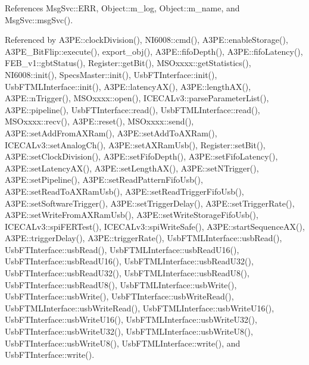 References Msg\+Svc\+::\+E\+RR, Object\+::m\+\_\+log, Object\+::m\+\_\+name, and Msg\+Svc\+::msg\+Svc().



Referenced by A3\+P\+E\+::clock\+Division(), N\+I6008\+::cmd(), A3\+P\+E\+::enable\+Storage(), A3\+P\+E\+\_\+\+Bit\+Flip\+::execute(), export\+\_\+obj(), A3\+P\+E\+::fifo\+Depth(), A3\+P\+E\+::fifo\+Latency(), F\+E\+B\+\_\+v1\+::gbt\+Status(), Register\+::get\+Bit(), M\+S\+Oxxxx\+::get\+Statistics(), N\+I6008\+::init(), Specs\+Master\+::init(), Usb\+F\+T\+Interface\+::init(), Usb\+F\+T\+M\+L\+Interface\+::init(), A3\+P\+E\+::latency\+A\+X(), A3\+P\+E\+::length\+A\+X(), A3\+P\+E\+::n\+Trigger(), M\+S\+Oxxxx\+::open(), I\+C\+E\+C\+A\+Lv3\+::parse\+Parameter\+List(), A3\+P\+E\+::pipeline(), Usb\+F\+T\+Interface\+::read(), Usb\+F\+T\+M\+L\+Interface\+::read(), M\+S\+Oxxxx\+::recv(), A3\+P\+E\+::reset(), M\+S\+Oxxxx\+::send(), A3\+P\+E\+::set\+Add\+From\+A\+X\+Ram(), A3\+P\+E\+::set\+Add\+To\+A\+X\+Ram(), I\+C\+E\+C\+A\+Lv3\+::set\+Analog\+Ch(), A3\+P\+E\+::set\+A\+X\+Ram\+Usb(), Register\+::set\+Bit(), A3\+P\+E\+::set\+Clock\+Division(), A3\+P\+E\+::set\+Fifo\+Depth(), A3\+P\+E\+::set\+Fifo\+Latency(), A3\+P\+E\+::set\+Latency\+A\+X(), A3\+P\+E\+::set\+Length\+A\+X(), A3\+P\+E\+::set\+N\+Trigger(), A3\+P\+E\+::set\+Pipeline(), A3\+P\+E\+::set\+Read\+Pattern\+Fifo\+Usb(), A3\+P\+E\+::set\+Read\+To\+A\+X\+Ram\+Usb(), A3\+P\+E\+::set\+Read\+Trigger\+Fifo\+Usb(), A3\+P\+E\+::set\+Software\+Trigger(), A3\+P\+E\+::set\+Trigger\+Delay(), A3\+P\+E\+::set\+Trigger\+Rate(), A3\+P\+E\+::set\+Write\+From\+A\+X\+Ram\+Usb(), A3\+P\+E\+::set\+Write\+Storage\+Fifo\+Usb(), I\+C\+E\+C\+A\+Lv3\+::spi\+F\+E\+R\+Test(), I\+C\+E\+C\+A\+Lv3\+::spi\+Write\+Safe(), A3\+P\+E\+::start\+Sequence\+A\+X(), A3\+P\+E\+::trigger\+Delay(), A3\+P\+E\+::trigger\+Rate(), Usb\+F\+T\+M\+L\+Interface\+::usb\+Read(), Usb\+F\+T\+Interface\+::usb\+Read(), Usb\+F\+T\+M\+L\+Interface\+::usb\+Read\+U16(), Usb\+F\+T\+Interface\+::usb\+Read\+U16(), Usb\+F\+T\+M\+L\+Interface\+::usb\+Read\+U32(), Usb\+F\+T\+Interface\+::usb\+Read\+U32(), Usb\+F\+T\+M\+L\+Interface\+::usb\+Read\+U8(), Usb\+F\+T\+Interface\+::usb\+Read\+U8(), Usb\+F\+T\+M\+L\+Interface\+::usb\+Write(), Usb\+F\+T\+Interface\+::usb\+Write(), Usb\+F\+T\+Interface\+::usb\+Write\+Read(), Usb\+F\+T\+M\+L\+Interface\+::usb\+Write\+Read(), Usb\+F\+T\+M\+L\+Interface\+::usb\+Write\+U16(), Usb\+F\+T\+Interface\+::usb\+Write\+U16(), Usb\+F\+T\+M\+L\+Interface\+::usb\+Write\+U32(), Usb\+F\+T\+Interface\+::usb\+Write\+U32(), Usb\+F\+T\+M\+L\+Interface\+::usb\+Write\+U8(), Usb\+F\+T\+Interface\+::usb\+Write\+U8(), Usb\+F\+T\+M\+L\+Interface\+::write(), and Usb\+F\+T\+Interface\+::write().


